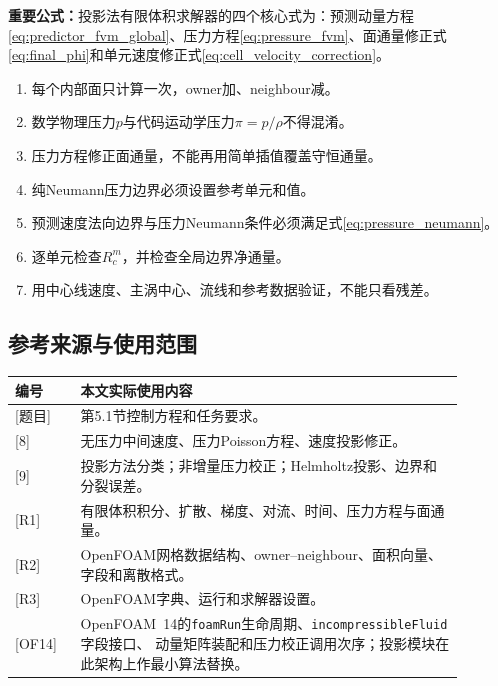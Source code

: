 \documentclass[UTF8,12pt,a4paper]{ctexart}
\numberwithin{equation}{section}
\newcommand{\Task}{\textnormal{[题目]}}
\newcommand{\Chorin}{\textnormal{[8]}}
\newcommand{\Guermond}{\textnormal{[9]}}
\newcommand{\Rone}{\textnormal{[R1]}}
\newcommand{\Rtwo}{\textnormal{[R2]}}
\newcommand{\Rthree}{\textnormal{[R3]}}
\newcommand{\OFfourteen}{\textnormal{[OF14]}}
\newcommand{\keytitle}[1]{\par\smallskip\noindent\colorbox{keybg}{%
  \parbox{0.965\linewidth}{\color{keyblue}\textbf{重要公式：}#1}}\par\smallskip}
\begin{document}
\keytitle{投影法有限体积求解器的四个核心式为：预测动量方程\eqref{eq:predictor_fvm_global}、压力方程\eqref{eq:pressure_fvm}、面通量修正式\eqref{eq:final_phi}和单元速度修正式\eqref{eq:cell_velocity_correction}。}

\begin{enumerate}
  \item 每个内部面只计算一次，owner加、neighbour减。
  \item 数学物理压力$p$与代码运动学压力$\pi=p/\rho$不得混淆。
  \item 压力方程修正面通量，不能再用简单插值覆盖守恒通量。
  \item 纯Neumann压力边界必须设置参考单元和值。
  \item 预测速度法向边界与压力Neumann条件必须满足式\eqref{eq:pressure_neumann}。
  \item 逐单元检查$R_c^m$，并检查全局边界净通量。
  \item 用中心线速度、主涡中心、流线和参考数据验证，不能只看残差。
\end{enumerate}

\subsection{参考来源与使用范围}
\begin{longtable}{p{0.13\linewidth}p{0.76\linewidth}}
\toprule
编号 & 本文实际使用内容\\
\midrule
\Task & 第5.1节控制方程和任务要求。\\
\Chorin & 无压力中间速度、压力Poisson方程、速度投影修正。\\
\Guermond & 投影方法分类；非增量压力校正；Helmholtz投影、边界和分裂误差。\\
\Rone & 有限体积积分、扩散、梯度、对流、时间、压力方程与面通量。\\
\Rtwo & OpenFOAM网格数据结构、owner--neighbour、面积向量、字段和离散格式。\\
\Rthree & OpenFOAM字典、运行和求解器设置。\\
\OFfourteen & OpenFOAM~14的\texttt{foamRun}生命周期、\texttt{incompressibleFluid}字段接口、
动量矩阵装配和压力校正调用次序；投影模块在此架构上作最小算法替换。\\
\bottomrule
\end{longtable}
\end{document}
